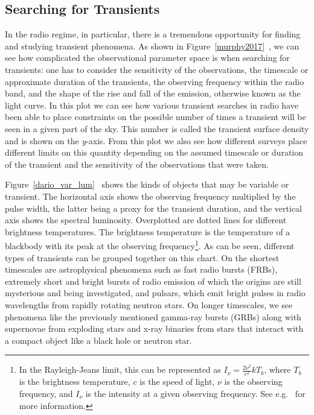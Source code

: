 \documentclass[12pt]{article}
\begin{document}
\subsection{Searching for Transients}


In the radio regime, in particular, there is a tremendous opportunity for finding and studying transient phenomena. As shown in Figure~\ref{murphy2017}~\citep{2017MNRAS.466.1944M}, we can see how complicated the observational parameter space is when searching for transients: one has to consider the sensitivity of the observations, the timescale or approximate duration of the transients, the observing frequency within the radio band, and the shape of the rise and fall of the emission, otherwise known as the light curve. In this plot we can see how various transient searches in radio have been able to place constraints on the possible number of times a transient will be seen in a given part of the sky. This number is called the transient surface density and is shown on the \textit{y}-axis. From this plot we also see how different surveys place different limits on this quantity depending on the assumed timescale or duration of the transient and the sensitivity of the observations that were taken. 

Figure~\ref{dario_var_lum}~\citep{2015MNRAS.446.3687P} shows the kinds of objects that may be variable or transient. The horizontal axis shows the observing frequency multiplied by the pulse width, the latter being a proxy for the transient duration, and the vertical axis shows the spectral luminosity. Overplotted are dotted lines for different brightness temperatures. The brightness temperature is the temperature of a blackbody with its peak at the observing frequency\footnote{In the Rayleigh-Jeans limit, this can be represented as $I_{\nu}=\frac{2\nu^2}{c^2}kT_b$, where $T_b$ is the brightness temperature, $c$ is the speed of light, $\nu$ is the observing frequency, and $I_{\nu}$ is the intensity at a given observing frequency. See e.g.~\citep{1986rpa..book.....R} for more information.}. As can be seen, different types of transients can be grouped together on this chart. On the shortest timescales are astrophysical phenomena such as fast radio bursts (FRBs), extremely short and bright bursts of radio emission of which the origins are still mysterious and being investigated, and pulsars, which emit bright pulses in radio wavelengths from rapidly rotating neutron stars. On longer timescales, we see phenomena like the previously mentioned gamma-ray bursts (GRBs) along with supernovae from exploding stars and x-ray binaries from stars that interact with a compact object like a black hole or neutron star. 
\end{document}
